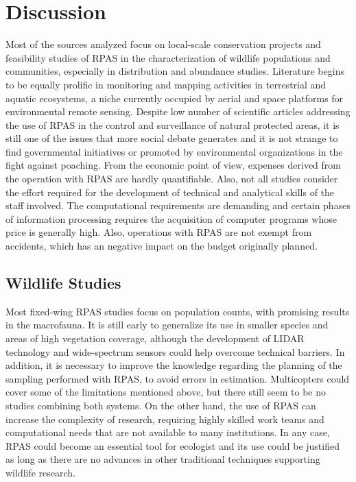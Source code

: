 \documentclass[]{interact}
\theoremstyle{plain}%
\theoremstyle{definition}
\theoremstyle{remark}
\begin{document}
\section{Discussion}\label{discussion}

Most of the sources analyzed focus on local-scale conservation projects
and feasibility studies of RPAS in the characterization of wildlife
populations and communities, especially in distribution and abundance
studies. Literature begins to be equally prolific in monitoring and
mapping activities in terrestrial and aquatic ecosystems, a niche
currently occupied by aerial and space platforms for environmental
remote sensing. Despite low number of scientific articles addressing the
use of RPAS in the control and surveillance of natural protected areas,
it is still one of the issues that more social debate generates and it
is not strange to find governmental initiatives or promoted by
environmental organizations in the fight against poaching. From the
economic point of view, expenses derived from the operation with RPAS
are hardly quantifiable. Also, not all studies consider the effort
required for the development of technical and analytical skills of the
staff involved. The computational requirements are demanding and certain
phases of information processing requires the acquisition of computer
programs whose price is generally high. Also, operations with RPAS are
not exempt from accidents, which has an negative impact on the budget
originally planned.

\subsection{Wildlife Studies}\label{wildlife-studies-1}

Most fixed-wing RPAS studies focus on population counts, with promising
results in the macrofauna. It is still early to generalize its use in
smaller species and areas of high vegetation coverage, although the
development of LIDAR technology and wide-spectrum sensors could help
overcome technical barriers. In addition, it is necessary to improve the
knowledge regarding the planning of the sampling performed with RPAS, to
avoid errors in estimation. Multicopters could cover some of the
limitations mentioned above, but there still seem to be no studies
combining both systems. On the other hand, the use of RPAS can increase
the complexity of research, requiring highly skilled work teams and
computational needs that are not available to many institutions. In any
case, RPAS could become an essential tool for ecologist and its use
could be justified as long as there are no advances in other traditional
techniques supporting wildlife research.
\end{document}
